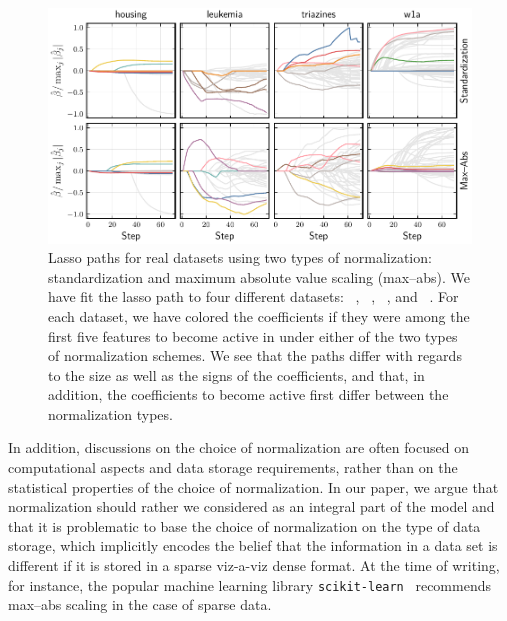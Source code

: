 \begin{figure}[bpt]
  \centering
  \includegraphics[]{plots/realdata_paths.pdf}
  \caption{%
    Lasso paths for real datasets using two types of normalization: standardization and maximum absolute value scaling (max--abs). We have fit the lasso path to four different datasets: ~\citep{harrison1978}, ~\citep{golub1999}, ~\citep{king}, and ~\citep{platt1998}. For each dataset, we have colored the coefficients if they were among the first five features to become active in under either of the two types of normalization schemes. We see that the paths differ with regards to the size as well as the signs of the coefficients, and that, in addition, the coefficients to become active first differ between the normalization types.
  }
  \label{fig:realdata-paths}
\end{figure}

In addition, discussions on the choice of normalization are often focused on computational aspects and data storage requirements, rather than on the statistical properties of the choice of normalization. In our paper, we argue that normalization should rather we considered as an integral part of the model and that it is problematic to base the choice of normalization on the type of data storage, which implicitly encodes the belief that the information in a data set is different if it is stored in a sparse viz-a-viz  dense format. At the time of writing, for instance, the popular machine learning library \texttt{scikit-learn}~\citep{scikit-learndevelopers2024} recommends max--abs scaling in the case of sparse data.
